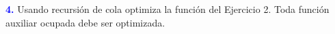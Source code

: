 \textbf{\textcolor{blue}{4.}} \Large
Usando recursión de cola optimiza la función del Ejercicio 2. Toda función auxiliar ocupada
debe ser optimizada.\\
